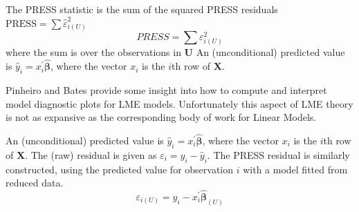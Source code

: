 \documentclass[12pt, a4paper]{report}
\theoremstyle{plain}
\theoremstyle{definition}
\theoremstyle{remark}
\begin{document}
	The PRESS statistic is the sum of the squared PRESS residuals
	$\mbox{PRESS} = \sum \hat{\varepsilon}^2_{i(U)}$
	\[ PRESS = \sum \varepsilon^2_{i(U)} \]
	where the sum is over the observations in $\boldsymbol{U}$	
	An (unconditional) predicted value is $\hat{y}_i = x^{\prime}_i \boldsymbol{\hat{\beta}}$, where 
	the vector $x_i$ is the $i$th row of $\boldsymbol{X}$. 
	
%	
%	
%	
%	
	
	
	
	Pinheiro and Bates provide some insight into how to compute and interpret model diagnostic plots for LME models. Unfortunately this aspect of LME theory is not as expansive as the corresponding body of work for Linear Models.
	
	

	
	An (unconditional) predicted value is $\hat{y}_i = x^{\prime}_i \boldsymbol{\hat{\beta}}$, where 
	the vector $x_i$ is the $i$th row of $\boldsymbol{X}$.
	The (raw) residual is given as $\varepsilon_i = y_i - \hat{y}_i$. The PRESS residual is
	similarly constructed, using the predicted value for observation $i$ with a model fitted from reduced data.
	\[ \varepsilon_{i(U)} = y_i - x^{\prime}_i \boldsymbol{\hat{\beta}}_{(U)} \]
	
	
	
\end{document}
